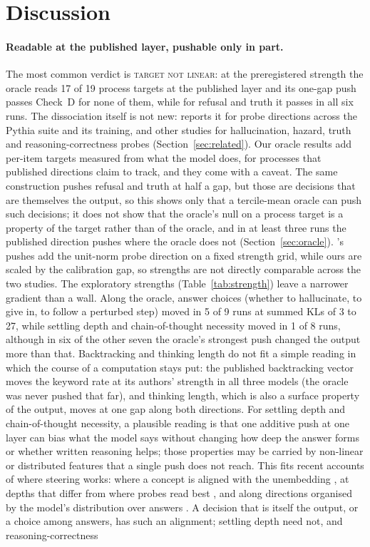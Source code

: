 \documentclass[11pt]{article}
\newcommand{\verdict}[1]{\textsc{\MakeLowercase{#1}}}
\begin{document}
\section{Discussion}\label{sec:discussion}

\paragraph{Readable at the published layer, pushable only in part.} The most common verdict is \verdict{TARGET NOT LINEAR}: at the preregistered strength the oracle reads 17 of 19 process targets at the published layer and its one-gap push passes Check~D for none of them, while for refusal and truth it passes in all six runs. The dissociation itself is not new: \citet{xun2026lagged} reports it for probe directions across the Pythia suite and its training, and other studies for hallucination, hazard, truth and reasoning-correctness probes (Section~\ref{sec:related}). Our oracle results add per-item targets measured from what the model does, for processes that published directions claim to track, and they come with a caveat. The same construction pushes refusal and truth at half a gap, but those are decisions that are themselves the output, so this shows only that a tercile-mean oracle can push such decisions; it does not show that the oracle's null on a process target is a property of the target rather than of the oracle, and in at least three runs the published direction pushes where the oracle does not (Section~\ref{sec:oracle}). \citet{xun2026lagged}'s pushes add the unit-norm probe direction on a fixed strength grid, while ours are scaled by the calibration gap, so strengths are not directly comparable across the two studies. The exploratory strengths (Table~\ref{tab:strength}) leave a narrower gradient than a wall. Along the oracle, answer choices (whether to hallucinate, to give in, to follow a perturbed step) moved in 5 of 9 runs at summed KLs of 3 to 27, while settling depth and chain-of-thought necessity moved in 1 of 8 runs, although in six of the other seven the oracle's strongest push changed the output more than that. Backtracking and thinking length do not fit a simple reading in which the course of a computation stays put: the published backtracking vector moves the keyword rate at its authors' strength in all three models (the oracle was never pushed that far), and thinking length, which is also a surface property of the output, moves at one gap along both directions. For settling depth and chain-of-thought necessity, a plausible reading is that one additive push at one layer can bias what the model says without changing how deep the answer forms or whether written reasoning helps; those properties may be carried by non-linear or distributed features that a single push does not reach. This fits recent accounts of where steering works: where a concept is aligned with the unembedding \citep{billa2026lap}, at depths that differ from where probes read best \citep{wang2026readbest}, and along directions organised by the model's distribution over answers \citep{yu2026answerbasin}. A decision that is itself the output, or a choice among answers, has such an alignment; settling depth need not, and reasoning-correctness 
\end{document}
